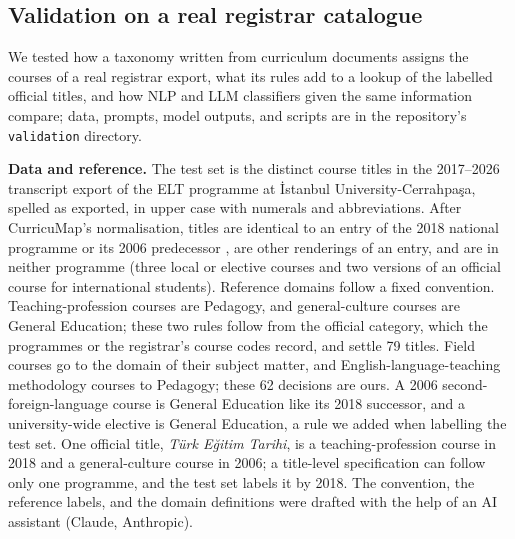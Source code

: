 \documentclass[preprint,12pt,a4paper]{elsarticle}
\begin{document}
\subsection{Validation on a real registrar catalogue}
\label{sec:validation}

We tested how a taxonomy written from curriculum documents assigns the courses of a real registrar export, what its rules add to a lookup of the labelled official titles, and how NLP and LLM classifiers given the same information compare; data, prompts, model outputs, and scripts are in the repository's \texttt{validation} directory.

\textbf{Data and reference.} The test set is the \nTitles{} distinct course titles in the 2017--2026 transcript export of the ELT programme at \.Istanbul University-Cerrahpa\c{s}a, spelled as exported, in upper case with numerals and abbreviations. After CurricuMap's normalisation, \nExact{} titles are identical to an entry of the 2018 national programme \cite{yok2018} or its 2006 predecessor \cite{yok2006}, \nVariant{} are other renderings of an entry, and \nUnseen{} are in neither programme (three local or elective courses and two versions of an official course for international students). Reference domains follow a fixed convention. Teaching-profession courses are Pedagogy, and general-culture courses are General Education; these two rules follow from the official category, which the programmes or the registrar's course codes record, and settle 79 titles. Field courses go to the domain of their subject matter, and English-language-teaching methodology courses to Pedagogy; these 62 decisions are ours. A 2006 second-foreign-language course is General Education like its 2018 successor, and a university-wide elective is General Education, a rule we added when labelling the test set. One official title, \emph{T\"urk E\u{g}itim Tarihi}, is a teaching-profession course in 2018 and a general-culture course in 2006; a title-level specification can follow only one programme, and the test set labels it by 2018. The convention, the reference labels, and the domain definitions were drafted with the help of an AI assistant (Claude, Anthropic).
\end{document}
